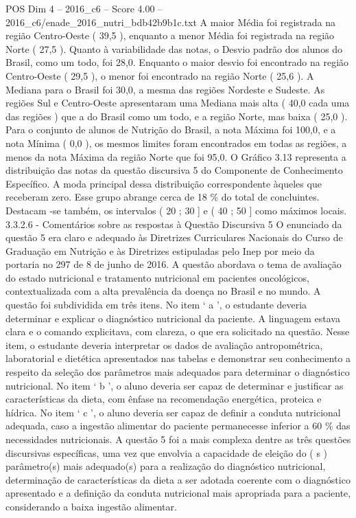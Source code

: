 \begin{textsample}{POS Dim 4 – 2016\_c6 – Score 4.00 – 2016\_c6/enade\_2016\_nutri\_bdb42b9b1c.txt}
A maior Média foi registrada na região Centro-Oeste ( 39,5 ), enquanto a menor Média foi registrada na região Norte ( 27,5 ).
Quanto à variabilidade das notas, o Desvio padrão dos alunos do Brasil, como um todo, foi 28,0.
Enquanto o maior desvio foi encontrado na região Centro-Oeste ( 29,5 ), o menor foi encontrado na região Norte ( 25,6 ).
A Mediana para o Brasil foi 30,0, a mesma das regiões Nordeste e Sudeste.
As regiões Sul e Centro-Oeste apresentaram uma Mediana mais alta ( 40,0 cada uma das regiões ) que a do Brasil como um todo, e a região Norte, mas baixa ( 25,0 ).
Para o conjunto de alunos de Nutrição do Brasil, a nota Máxima foi 100,0, e a nota Mínima ( 0,0 ), os mesmos limites foram encontrados em todas as regiões, a menos da nota Máxima da região Norte que foi 95,0.
O Gráfico 3.13 representa a distribuição das notas da questão discursiva 5 do Componente de Conhecimento Específico.
A moda principal dessa distribuição correspondente àqueles que receberam zero.
Esse grupo abrange cerca de 18 \% do total de concluintes.
Destacam -se também, os intervalos ( 20 ; 30 ] e ( 40 ; 50 ] como máximos locais. 3.3.2.6 - Comentários sobre as respostas à Questão Discursiva 5 O enunciado da questão 5 era claro e adequado às Diretrizes Curriculares Nacionais do Curso de Graduação em Nutrição e às Diretrizes estipuladas pelo Inep por meio da portaria no 297 de 8 de junho de 2016.
A questão abordava o tema de avaliação do estado nutricional e tratamento nutricional em pacientes oncológicos, contextualizada com a alta prevalência da doença no Brasil e no mundo.
A questão foi subdividida em três itens.
No item ‘ a ’, o estudante deveria determinar e explicar o diagnóstico nutricional da paciente.
A linguagem estava clara e o comando explicitava, com clareza, o que era solicitado na questão.
Nesse item, o estudante deveria interpretar os dados de avaliação antropométrica, laboratorial e dietética apresentados nas tabelas e demonstrar seu conhecimento a respeito da seleção dos parâmetros mais adequados para determinar o diagnóstico nutricional.
No item ‘ b ’, o aluno deveria ser capaz de determinar e justificar as características da dieta, com ênfase na recomendação energética, proteica e hídrica.
No item ‘ c ’, o aluno deveria ser capaz de definir a conduta nutricional adequada, caso a ingestão alimentar do paciente permanecesse inferior a 60 \% das necessidades nutricionais.
A questão 5 foi a mais complexa dentre as três questões discursivas específicas, uma vez que envolvia a capacidade de eleição do ( s ) parâmetro(s) mais adequado(s) para a realização do diagnóstico nutricional, determinação de características da dieta a ser adotada coerente com o diagnóstico apresentado e a definição da conduta nutricional mais apropriada para a paciente, considerando a baixa ingestão alimentar.

\end{textsample}
